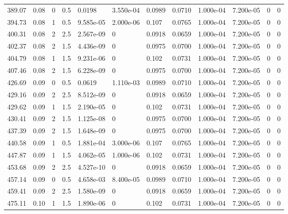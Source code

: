 \documentclass[preview]{standalone}
\begin{document}
{{{\begin{tabular}{L{1.2cm}C{1.2cm} C{0.3cm}C{0.5cm} C{1.4cm}C{1.4cm} C{1.4cm}C{1.4cm} C{1.6cm}C{1.6cm} C{1.6cm}C{1.6cm}}
  389.07  &  0.08  & 0     & 0.5 &  0.0198  & 3.550e-04  &  0.0989&   0.0710& 1.000e-04 & 7.200e-05   &  0 & 0  \\ 
  394.73  &  0.08  & 1     & 0.5 &  9.585e-05  & 2.000e-06  &  0.107&   0.0765& 1.000e-04 & 7.200e-05   &  0 & 0  \\ 
  400.31  &  0.08  & 2     & 2.5 &  2.567e-09  & 0  &  0.0918&   0.0659& 1.000e-04 & 7.200e-05   &  0 & 0  \\ 
  402.37  &  0.08  & 2     & 1.5 &  4.436e-09  & 0  &  0.0975&   0.0700& 1.000e-04 & 7.200e-05   &  0 & 0  \\ 
  404.79  &  0.08  & 1     & 1.5 &  9.231e-06  & 0  &  0.102&   0.0731& 1.000e-04 & 7.200e-05   &  0 & 0  \\ 
  407.46  &  0.08  & 2     & 1.5 &  6.228e-09  & 0  &  0.0975&   0.0700& 1.000e-04 & 7.200e-05   &  0 & 0  \\ 
  426.69  &  0.09  & 0     & 0.5 &  0.0619  & 1.110e-03  &  0.0989&   0.0710& 1.000e-04 & 7.200e-05   &  0 & 0  \\ 
  429.16  &  0.09  & 2     & 2.5 &  8.512e-09  & 0  &  0.0918&   0.0659& 1.000e-04 & 7.200e-05   &  0 & 0  \\ 
  429.62  &  0.09  & 1     & 1.5 &  2.190e-05  & 0  &  0.102&   0.0731& 1.000e-04 & 7.200e-05   &  0 & 0  \\ 
  430.41  &  0.09  & 2     & 1.5 &  1.125e-08  & 0  &  0.0975&   0.0700& 1.000e-04 & 7.200e-05   &  0 & 0  \\ 
  437.39  &  0.09  & 2     & 1.5 &  1.648e-09  & 0  &  0.0975&   0.0700& 1.000e-04 & 7.200e-05   &  0 & 0  \\ 
  440.58  &  0.09  & 1     & 0.5 &  1.881e-04  & 3.000e-06  &  0.107&   0.0765& 1.000e-04 & 7.200e-05   &  0 & 0  \\ 
  447.87  &  0.09  & 1     & 1.5 &  4.062e-05  & 1.000e-06  &  0.102&   0.0731& 1.000e-04 & 7.200e-05   &  0 & 0  \\ 
  453.68  &  0.09  & 2     & 2.5 &  4.527e-10  & 0  &  0.0918&   0.0659& 1.000e-04 & 7.200e-05   &  0 & 0  \\ 
  457.14  &  0.09  & 0     & 0.5 &  4.658e-03  & 8.400e-05  &  0.0989&   0.0710& 1.000e-04 & 7.200e-05   &  0 & 0  \\ 
  459.41  &  0.09  & 2     & 2.5 &  1.580e-09  & 0  &  0.0918&   0.0659& 1.000e-04 & 7.200e-05   &  0 & 0  \\ 
  475.11  &  0.10  & 1     & 1.5 &  1.890e-06  & 0  &  0.102&   0.0731& 1.000e-04 & 7.200e-05   &  0 & 0  \\ 

\end{tabular}}}}
\end{document}
